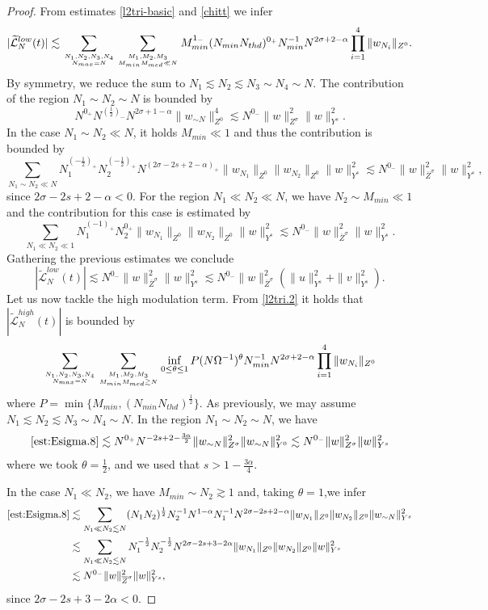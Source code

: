 \documentclass{amsart}
\theoremstyle{definition}
\theoremstyle{remark}
\numberwithin{equation}{section}
\begin{document}
\begin{proof}
From estimates \eqref{l2tri-basic} and \eqref{chitt} we infer
$$
|\widetilde{\mathcal{L}}_N^{low}(t)| \lesssim \sum_{N_1, N_2, N_3, N_4 \atop N_{max}=N} \sum_{M_1,M_2,M_3\atop M_{min}M_{med}\ll N} M_{min}^{1_-}(N_{min}N_{thd})^{0_+} N_{min}^{-1} N^{2\sigma+2-\alpha} \prod_{i=1}^4 \|w_{N_i}\|_{Z^0}.
$$
By symmetry, we reduce the sum to $N_1\lesssim N_2\lesssim N_3\sim N_4\sim N$. The contribution of the region $N_1\sim N_2\sim N$ is bounded by
$$
N^{0_+} N^{(\frac 12)_-} N^{2\sigma+1-\alpha} \|w_{\sim N}\|_{Z^0}^4 \lesssim N^{0_-} \|w\|_{Z^\sigma}^2 \|w\|_{Y^s}^2.
$$
In the case $N_1\sim N_2\ll N$, it holds $M_{min}\ll 1$ and thus the contribution is bounded by
$$
\sum_{N_1\sim N_2\ll N} N_1^{(-\frac 12)_+} N_2^{(-\frac 12)_+} N^{(2\sigma-2s+2-\alpha)_+} \|w_{N_1}\|_{Z^0} \|w_{N_2}\|_{Z^0} \|w\|_{Y^s}^2 \lesssim N^{0_-}  \|w\|_{\overline{Z}^\sigma}^2 \|w\|_{Y^s}^2,
$$
since $2\sigma-2s+2-\alpha<0$.
For the region $N_1\ll N_2\ll N$, we have $N_2\sim M_{min}\ll 1$ and the contribution for this case is estimated by
$$
\sum_{N_1\ll N_2\ll 1} N_1^{(-1)_+} N_2^{0_+} \|w_{N_1}\|_{Z^0} \|w_{N_2}\|_{Z^0} \|w\|_{Y^s}^2 \lesssim N^{0_-}  \|w\|_{\overline{Z}^\sigma}^2 \|w\|_{Y^s}^2. 
$$
Gathering the previous estimates we conclude
\begin{equation}\label{est:Esigma.7}
|\widetilde{\mathcal{L}}_N^{low}(t)| \lesssim N^{0_-} \|w\|_{\overline{Z}^\sigma}^2 \|w\|_{Y^s}^2 \lesssim N^{0_-} \|w\|_{\overline{Z}^\sigma}^2 (\|u\|_{Y^s}^2 + \|v\|_{Y^s}^2).
\end{equation}
Let us now tackle the high modulation term. From \eqref{l2tri.2} it holds that $|\widetilde{\mathcal{L}}_N^{high}(t)|$ is bounded by
\begin{equation}\label{est:Esigma.8}
 \sum_{N_1, N_2, N_3, N_4 \atop N_{max}=N} \sum_{M_1,M_2,M_3\atop M_{min}M_{med}\gtrsim N} \inf_{0\le \theta\le 1} P (N\Omega^{-1})^\theta N_{min}^{-1} N^{2\sigma+2-\alpha} \prod_{i=1}^4 \|w_{N_i}\|_{Z^0}
\end{equation}
where $P=\min\{M_{min}, (N_{min}N_{thd})^{\frac 12}\}$. As previously, we may assume $N_1\lesssim N_2\lesssim N_3\sim N_4\sim N$. In the region $N_1\sim N_2\sim N$, we have 
$$
\eqref{est:Esigma.8} \lesssim N^{0_+} N^{-2s+2-\frac{3\alpha}2} \|w_{\sim N}\|_{Z^\sigma}^2 \|w_{\sim N}\|_{Y^0}^2 \lesssim N^{0_-} \|w\|_{Z^\sigma}^2 \|w\|_{Y^s}^2
$$
where we took $\theta=\frac 12$, and we used that $s>1-\frac{3\alpha}4$. 

In the case $N_1\ll N_2$, we have $M_{min}\sim N_2\gtrsim 1$ and, taking $\theta=1$,we infer 
\begin{align*}
\eqref{est:Esigma.8}  & \lesssim \sum_{N_1\ll N_2\lesssim N} (N_1N_2)^{\frac 12} N_2^{-1} N^{1-\alpha} N_1^{-1} N^{2\sigma-2s+2-\alpha} \|w_{N_1}\|_{Z^0} \|w_{N_2}\|_{Z^0} \|w_{\sim N}\|_{Y^s}^2 \\
  & \lesssim \sum_{N_1\ll N_2\lesssim N} N_1^{-\frac 12} N_2^{-\frac 12} N^{2\sigma-2s+3-2\alpha} \|w_{N_1}\|_{Z^0} \|w_{N_2}\|_{Z^0} \|w\|_{Y^s}^2\\
  & \lesssim N^{0_-} \|w\|_{\overline{Z}^\sigma}^2 \|w\|_{Y^s}^2,
\end{align*}
since $2\sigma-2s+3-2\alpha < 0$. 


\end{proof}
\end{document}
